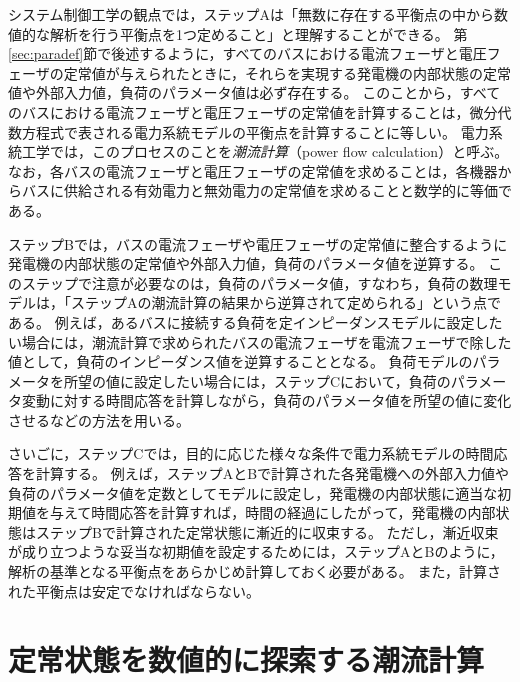 \documentclass[tombow,dvipdfmx]{corona-a5-1.1}
\begin{document}
システム制御工学の観点では，ステップAは「無数に存在する平衡点の中から数値的な解析を行う平衡点を1つ定めること」と理解することができる。
第\ref{sec:paradef}節で後述するように，すべてのバスにおける電流フェーザと電圧フェーザの定常値が与えられたときに，それらを実現する発電機の内部状態の定常値や外部入力値，負荷のパラメータ値は必ず存在する。
このことから，すべてのバスにおける電流フェーザと電圧フェーザの定常値を計算することは，微分代数方程式で表される電力系統モデルの平衡点を計算することに等しい。
電力系統工学では，このプロセスのことを\emph{潮流計算}（power flow calculation）と呼ぶ。
なお，各バスの電流フェーザと電圧フェーザの定常値を求めることは，各機器からバスに供給される有効電力と無効電力の定常値を求めることと数学的に等価である。

ステップBでは，バスの電流フェーザや電圧フェーザの定常値に整合するように発電機の内部状態の定常値や外部入力値，負荷のパラメータ値を逆算する。
このステップで注意が必要なのは，負荷のパラメータ値，すなわち，負荷の数理モデルは，「ステップAの潮流計算の結果から逆算されて定められる」という点である。
例えば，あるバスに接続する負荷を定インピーダンスモデルに設定したい場合には，潮流計算で求められたバスの電流フェーザを電流フェーザで除した値として，負荷のインピーダンス値を逆算することとなる。
負荷モデルのパラメータを所望の値に設定したい場合には，ステップCにおいて，負荷のパラメータ変動に対する時間応答を計算しながら，負荷のパラメータ値を所望の値に変化させるなどの方法を用いる。


さいごに，ステップCでは，目的に応じた様々な条件で電力系統モデルの時間応答を計算する。
例えば，ステップAとBで計算された各発電機への外部入力値や負荷のパラメータ値を定数としてモデルに設定し，発電機の内部状態に適当な初期値を与えて時間応答を計算すれば，時間の経過にしたがって，発電機の内部状態はステップBで計算された定常状態に漸近的に収束する。
ただし，漸近収束が成り立つような妥当な初期値を設定するためには，ステップAとBのように，解析の基準となる平衡点をあらかじめ計算しておく必要がある。
また，計算された平衡点は安定でなければならない。




\section{定常状態を数値的に探索する潮流計算}\label{sec:powflow}
\end{document}
